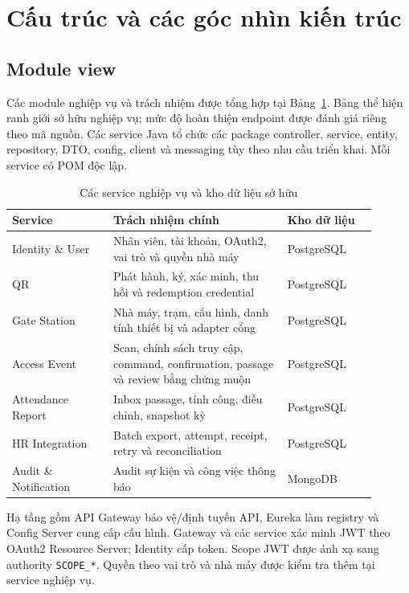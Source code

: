 ﻿\section{Cấu trúc và các góc nhìn kiến trúc}
\label{sec:architecture-views}

\subsection{Module view}
\label{subsec:module-view}
Các module nghiệp vụ và trách nhiệm được tổng hợp tại Bảng~\ref{tab:services}. Bảng thể hiện ranh giới sở hữu nghiệp vụ; mức độ hoàn thiện endpoint được đánh giá riêng theo mã nguồn. Các service Java tổ chức các package controller, service, entity, repository, DTO, config, client và messaging tùy theo nhu cầu triển khai. Mỗi service có POM độc lập.

\begin{table}[htbp]
\centering
\caption{Các service nghiệp vụ và kho dữ liệu sở hữu}\label{tab:services}
\begin{tabular}{|>{\raggedright\arraybackslash}p{0.25\linewidth}|>{\raggedright\arraybackslash}p{0.43\linewidth}|>{\raggedright\arraybackslash}p{0.22\linewidth}|}\hline
\textbf{Service} & \textbf{Trách nhiệm chính} & \textbf{Kho dữ liệu} \\\hline
Identity \& User & Nhân viên, tài khoản, OAuth2, vai trò và quyền nhà máy & PostgreSQL \\\hline
QR & Phát hành, ký, xác minh, thu hồi và redemption credential & PostgreSQL \\\hline
Gate Station & Nhà máy, trạm, cấu hình, danh tính thiết bị và adapter cổng & PostgreSQL \\\hline
Access Event & Scan, chính sách truy cập, command, confirmation, passage và review bằng chứng muộn & PostgreSQL \\\hline
Attendance Report & Inbox passage, tính công, điều chỉnh, snapshot kỳ & PostgreSQL \\\hline
HR Integration & Batch export, attempt, receipt, retry và reconciliation & PostgreSQL \\\hline
Audit \& Notification & Audit sự kiện và công việc thông báo & MongoDB \\\hline
\end{tabular}
\end{table}

Hạ tầng gồm API Gateway bảo vệ/định tuyến API, Eureka làm registry và Config Server cung cấp cấu hình. Gateway và các service xác minh JWT theo OAuth2 Resource Server; Identity cấp token. Scope JWT được ánh xạ sang authority \texttt{SCOPE\_*}. Quyền theo vai trò và nhà máy được kiểm tra thêm tại service nghiệp vụ.

